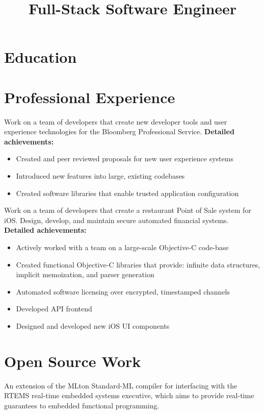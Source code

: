 \documentclass[11pt,a4paper,sans]{moderncv}
\title{Full-Stack Software Engineer}                          %
\begin{document}
\makecvtitle

\section{Education}

\section{Professional Experience}
        {Work on a team of developers that create new developer tools and user experience technologies for the Bloomberg Professional Service. \newline
  \textbf{Detailed achievements:}
  \begin{itemize}
  \item Created and peer reviewed proposals for new user experience systems
  \item Introduced new features into large, existing codebases
  \item Created software libraries that enable trusted application configuration
  \end{itemize}}
        
{Work on a team of developers that create a restaurant Point of Sale system for iOS. Design, develop, and maintain secure automated financial systems.
\newline
\textbf{Detailed achievements:}
\begin{itemize}%
\item Actively worked with a team on a large-scale Objective-C code-base
\item Created functional Objective-C libraries that provide: infinite data structures, implicit memoization, and parser generation
\item Automated software licensing over encrypted, timestamped channels
\item Developed API frontend
\item Designed and developed new iOS UI components
\end{itemize}}

\section{Open Source Work}
{
An extension of the MLton Standard-ML compiler for interfacing with the RTEMS real-time embedded systems executive, which aims to provide real-time guarantees to embedded functional programming.
}
\end{document}
